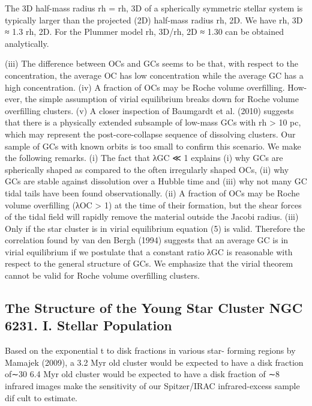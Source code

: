 \documentclass[../Main.tex]{subfiles}
\begin{document}
The 3D half-mass radius rh = rh, 3D of a spherically symmetric
stellar system is typically larger than the projected (2D) half-mass
radius rh, 2D. We have rh, 3D ≈ 1.3 rh, 2D. For the Plummer model
rh, 3D/rh, 2D ≈ 1.30 can be obtained analytically.

(iii) The difference between OCs and GCs seems to be that, with
respect to the concentration, the average OC has low concentration
while the average GC has a high concentration.
(iv) A fraction of OCs may be Roche volume overfilling. How-
ever, the simple assumption of virial equilibrium breaks down for
Roche volume overfilling clusters.
(v) A closer inspection of Baumgardt et al. (2010) suggests that
there is a physically extended subsample of low-mass GCs with
rh > 10 pc, which may represent the post-core-collapse sequence
of dissolving clusters. Our sample of GCs with known orbits is too
small to confirm this scenario.
We make the following remarks.
(i) The fact that λGC ≪ 1 explains (i) why GCs are spherically
shaped as compared to the often irregularly shaped OCs, (ii) why
GCs are stable against dissolution over a Hubble time and (iii) why
not many GC tidal tails have been found observationally.
(ii) A fraction of OCs may be Roche volume overfilling (λOC >
1) at the time of their formation, but the shear forces of the tidal
field will rapidly remove the material outside the Jacobi radius.
(iii) Only if the star cluster is in virial equilibrium equation (5)
is valid. Therefore the correlation found by van den Bergh (1994)
suggests that an average GC is in virial equilibrium if we postulate
that a constant ratio λGC is reasonable with respect to the general
structure of GCs. We emphasize that the virial theorem cannot be
valid for Roche volume overfilling clusters.

\subsection{The Structure of the Young Star Cluster NGC 6231. I. Stellar Population}


Based on the exponential t to disk fractions in various star-
forming regions by Mamajek (2009), a 3.2 Myr old cluster
would be expected to have a disk fraction of∼30%
6.4 Myr old cluster would be expected to have a disk fraction of
∼8%
infraredimages makethe sensitivity of our Spitzer/IRAC
infrared-excess sample dif cult to estimate.
\end{document}
